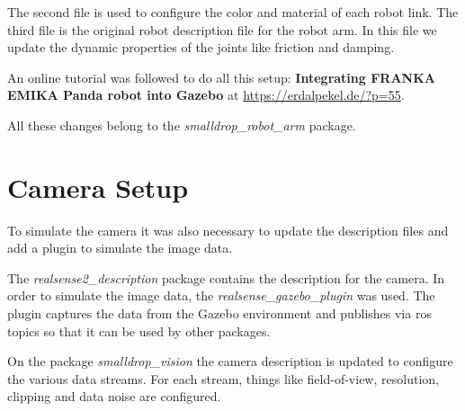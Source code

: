 The second file is used to configure the color and material of each robot link. The third file is the original robot description file for the robot arm. In this file we update the dynamic properties of the joints like friction and damping.

An online tutorial was followed to do all this setup: \textbf{Integrating FRANKA EMIKA Panda robot into Gazebo} at \url{https://erdalpekel.de/?p=55}.

All these changes belong to the \textit{smalldrop\_robot\_arm} package.


\section{Camera Setup}
\label{sec:gazebo_setup_camera}

To simulate the camera it was also necessary to update the description files and add a plugin to simulate the image data.

The \textit{realsense2\_description} package contains the description for the camera. In order to simulate the image data, the \textit{realsense\_gazebo\_plugin} was used. The plugin captures the data from the Gazebo environment and publishes via \gls{ros} topics so that it can be used by other packages.

On the package \textit{smalldrop\_vision} the camera description is updated to configure the various data streams. For each stream, things like field-of-view, resolution, clipping and data noise are configured.

